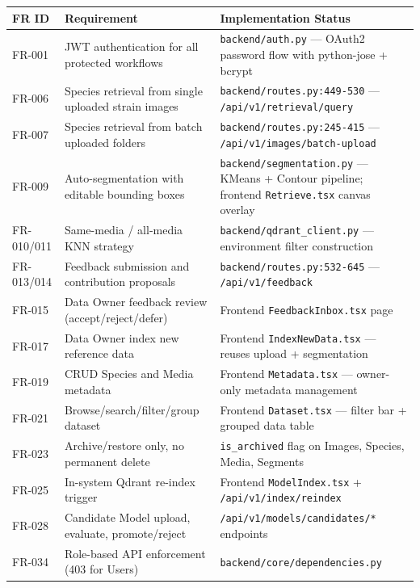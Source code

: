 \begin{center}
\begin{tabular}{@{}p{3cm} p{4.5cm} p{6.5cm}@{}}
\toprule
\textbf{FR ID} & \textbf{Requirement} & \textbf{Implementation Status} \\
\midrule
FR-001 & JWT authentication for all protected workflows & \texttt{backend/auth.py} --- OAuth2 password flow with python-jose + bcrypt \\
FR-006 & Species retrieval from single uploaded strain images & \texttt{backend/routes.py:449-530} --- \texttt{/api/v1/retrieval/query} \\
FR-007 & Species retrieval from batch uploaded folders & \texttt{backend/routes.py:245-415} --- \texttt{/api/v1/images/batch-upload} \\
FR-009 & Auto-segmentation with editable bounding boxes & \texttt{backend/segmentation.py} --- KMeans + Contour pipeline; frontend \texttt{Retrieve.tsx} canvas overlay \\
FR-010/011 & Same-media / all-media KNN strategy & \texttt{backend/qdrant\_client.py} --- environment filter construction \\
FR-013/014 & Feedback submission and contribution proposals & \texttt{backend/routes.py:532-645} --- \texttt{/api/v1/feedback} \\
FR-015 & Data Owner feedback review (accept/reject/defer) & Frontend \texttt{FeedbackInbox.tsx} page \\
FR-017 & Data Owner index new reference data & Frontend \texttt{IndexNewData.tsx} --- reuses upload + segmentation \\
FR-019 & CRUD Species and Media metadata & Frontend \texttt{Metadata.tsx} --- owner-only metadata management \\
FR-021 & Browse/search/filter/group dataset & Frontend \texttt{Dataset.tsx} --- filter bar + grouped data table \\
FR-023 & Archive/restore only, no permanent delete & \texttt{is\_archived} flag on Images, Species, Media, Segments \\
FR-025 & In-system Qdrant re-index trigger & Frontend \texttt{ModelIndex.tsx} + \texttt{/api/v1/index/reindex} \\
FR-028 & Candidate Model upload, evaluate, promote/reject & \texttt{/api/v1/models/candidates/*} endpoints \\
FR-034 & Role-based API enforcement (403 for Users) & \texttt{backend/core/dependencies.py} \\
\bottomrule
\end{tabular}
\end{center}

